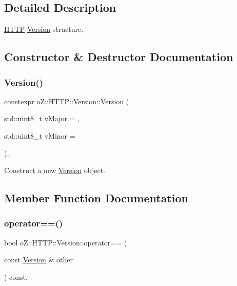 \subsection{Detailed Description}
\mbox{\hyperlink{namespaceo_z_1_1_h_t_t_p}{H\+T\+TP}} \mbox{\hyperlink{structo_z_1_1_h_t_t_p_1_1_version}{Version}} structure. 

\subsection{Constructor \& Destructor Documentation}
\mbox{\label{structo_z_1_1_h_t_t_p_1_1_version_a56b4ae16656db97e48feea33da112d65}} 
\subsubsection{\texorpdfstring{Version()}{Version()}}
{\footnotesize\ttfamily constexpr o\+Z\+::\+H\+T\+T\+P\+::\+Version\+::\+Version (\begin{DoxyParamCaption}\item[{std\+::uint8\+\_\+t}]{v\+Major = {},  }\item[{std\+::uint8\+\_\+t}]{v\+Minor = {} }\end{DoxyParamCaption})\hspace{0.3cm}{\ttfamily [inline]}, {\ttfamily [noexcept]}}



Construct a new \mbox{\hyperlink{structo_z_1_1_h_t_t_p_1_1_version}{Version}} object. 



\subsection{Member Function Documentation}
\mbox{\label{structo_z_1_1_h_t_t_p_1_1_version_a6d985577db3b920c4efa2a03c46b827b}} 
\subsubsection{\texorpdfstring{operator==()}{operator==()}}
{\footnotesize\ttfamily bool o\+Z\+::\+H\+T\+T\+P\+::\+Version\+::operator== (\begin{DoxyParamCaption}\item[{const \mbox{\hyperlink{structo_z_1_1_h_t_t_p_1_1_version}{Version}} \&}]{other }\end{DoxyParamCaption}) const\hspace{0.3cm}{\ttfamily [inline]}, {\ttfamily [noexcept]}}



